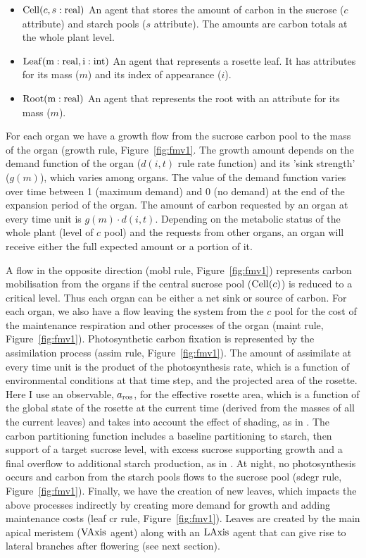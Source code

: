 %
\begin{itemize}
\item
  \(\mathrm{Cell}(c,s:\mathrm{real})\) An agent that stores the amount of
  carbon in the sucrose (\(c\) attribute) and starch pools (\(s\)
  attribute). The amounts are carbon totals at the whole plant level.
\item
  \(\mathrm{Leaf}(\mathrm{m}:\mathrm{real},\mathrm{i}:\mathrm{int})\) An agent that represents a
  rosette leaf. It has attributes for its mass (\(m\)) and its index of
  appearance (\(i\)).
\item
  \(\mathrm{Root}(\mathrm{m}:\mathrm{real})\) An agent that represents the root with
  an attribute for its mass (\(m\)).
\end{itemize}

For each organ we have a growth flow from the sucrose carbon pool to the mass of
the organ (\textsf{growth} rule, Figure~\ref{fig:fmv1}. The growth amount
depends on the demand function of the organ (\(d(i,t)\) rule rate function) and
its 'sink strength' (\(g(m)\)), which varies among organs. The value of the
demand function varies over time between 1 (maximum demand) and 0 (no demand) at
the end of the expansion period of the organ. The amount of carbon requested by
an organ at every time unit is \(g( m ) \cdot d(i,t)\). Depending on the
metabolic status of the whole plant (level of \(c\) pool) and the requests from
other organs, an organ will receive either the full expected amount or a portion
of it.

A flow in the opposite direction (\textsf{mobl} rule, Figure~\ref{fig:fmv1})
represents carbon mobilisation from the organs if the central sucrose pool
(\(\mathrm{Cell}(c)\)) is reduced to a critical level. Thus each organ can be either
a net sink or source of carbon. For each organ, we also have a flow leaving the
system from the \(c\) pool for the cost of the maintenance respiration and other
processes of the organ (\textsf{maint} rule,
Figure~\ref{fig:fmv1}). Photosynthetic carbon fixation is represented by the
assimilation process (\textsf{assim} rule, Figure~\ref{fig:fmv1}). The amount of
assimilate at every time unit is the product of the photosynthesis rate, which
is a function of environmental conditions at that time step, and the projected
area of the rosette. Here I use an observable, \(a_{\mathrm{ros}}\), for the
effective rosette area, which is a function of the global state of the rosette
at the current time (derived from the masses of all the current leaves) and
takes into account the effect of shading, as in
\citet{christophe_model-based_2008}. The carbon partitioning function includes a
baseline partitioning to starch, then support of a target sucrose level, with
excess sucrose supporting growth and a final overflow to additional starch
production, as in \citet{rasse_leaf_2006}. At night, no photosynthesis occurs
and carbon from the starch pools flows to the sucrose pool (\textsf{sdegr} rule,
Figure~\ref{fig:fmv1}). Finally, we have the creation of new leaves, which
impacts the above processes indirectly by creating more demand for growth and
adding maintenance costs (\textsf{leaf cr} rule, Figure~\ref{fig:fmv1}). Leaves
are created by the main apical meristem (\(\mathrm{VAxis}\) agent) along with an
\(\mathrm{LAxis}\) agent that can give rise to lateral branches after flowering (see
next section).

